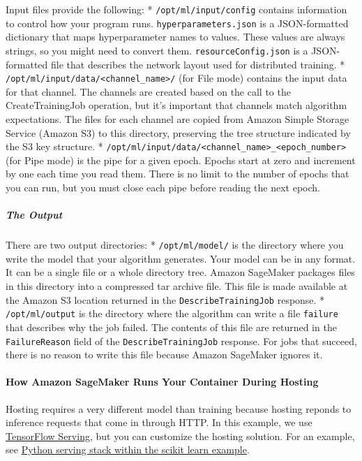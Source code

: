 \documentclass[11pt]{article}
\begin{document}
Input files provide the following: * \texttt{/opt/ml/input/config}
contains information to control how your program runs.
\texttt{hyperparameters.json} is a JSON-formatted dictionary that maps
hyperparameter names to values. These values are always strings, so you
might need to convert them. \texttt{resourceConfig.json} is a
JSON-formatted file that describes the network layout used for
distributed training. *
\texttt{/opt/ml/input/data/\textless{}channel\_name\textgreater{}/} (for
File mode) contains the input data for that channel. The channels are
created based on the call to the CreateTrainingJob operation, but it's
important that channels match algorithm expectations. The files for each
channel are copied from Amazon Simple Storage Service (Amazon S3) to
this directory, preserving the tree structure indicated by the S3 key
structure. *
\texttt{/opt/ml/input/data/\textless{}channel\_name\textgreater{}\_\textless{}epoch\_number\textgreater{}}
(for Pipe mode) is the pipe for a given epoch. Epochs start at zero and
increment by one each time you read them. There is no limit to the
number of epochs that you can run, but you must close each pipe before
reading the next epoch.

\subparagraph{The Output}\label{the-output}

There are two output directories: * \texttt{/opt/ml/model/} is the
directory where you write the model that your algorithm generates. Your
model can be in any format. It can be a single file or a whole directory
tree. Amazon SageMaker packages files in this directory into a
compressed tar archive file. This file is made available at the Amazon
S3 location returned in the \texttt{DescribeTrainingJob} response. *
\texttt{/opt/ml/output} is the directory where the algorithm can write a
file \texttt{failure} that describes why the job failed. The contents of
this file are returned in the \texttt{FailureReason} field of the
\texttt{DescribeTrainingJob} response. For jobs that succeed, there is
no reason to write this file because Amazon SageMaker ignores it.

\paragraph{How Amazon SageMaker Runs Your Container During
Hosting}\label{how-amazon-sagemaker-runs-your-container-during-hosting}

Hosting requires a very different model than training because hosting
reponds to inference requests that come in through HTTP. In this
example, we use \href{https://www.tensorflow.org/serving/}{TensorFlow
Serving}, but you can customize the hosting solution. For an example,
see
\href{https://github.com/awslabs/amazon-sagemaker-examples/blob/master/advanced_functionality/scikit_bring_your_own/scikit_bring_your_own.ipynb}{Python
serving stack within the scikit learn example}.
\end{document}
